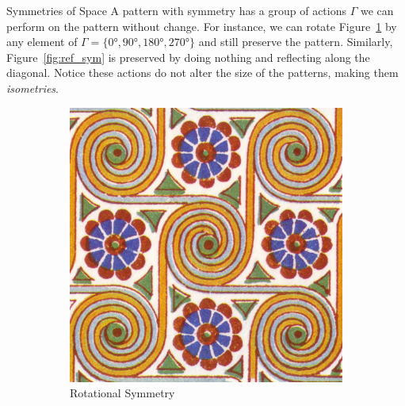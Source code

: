 \documentclass[final]{beamer}
\newlength{\onecolwid}
\begin{document}
\begin{frame}[t]
\begin{columns}[t]
\begin{column}{\onecolwid}
    \begin{block}{Symmetries of Space}
    A pattern with symmetry has a group of actions $\Gamma$ we can perform
    on the pattern without change. For instance, we can rotate
    Figure~\ref{fig:rot_sym} by any element of $\Gamma  = \{\ang{0}, \ang{90}, \ang{180}, \ang{270}\}$
    and still preserve the pattern. Similarly, Figure~\ref{fig:ref_sym} is
    preserved by doing nothing and reflecting along the diagonal. Notice
    these actions do not alter the size of the patterns, making them
    \emph{isometries}.
    \begin{figure}[c]
        \begin{subfigure}[c]{0.25\textwidth}
        \includegraphics[width=\textwidth]{images/p4_symmetry_wallpaper.jpg}
        \caption{Rotational Symmetry}
        \label{fig:rot_sym}
        \end{subfigure}
        \begin{subfigure}[c]{0.2\textwidth}

\end{subfigure}
\end{figure}
\end{block}
\end{column}
\end{columns}
\end{frame}
\end{document}
